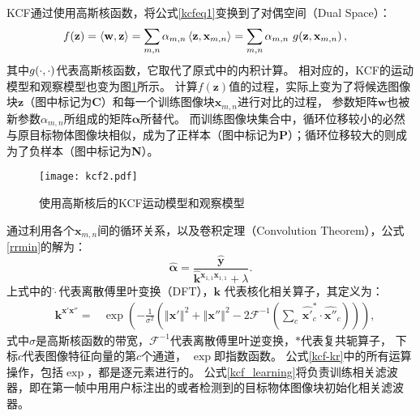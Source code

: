 KCF通过使用高斯核函数，将公式\ref{kcfeq1}变换到了对偶空间（Dual Space）：
\begin{equation}
\begin{aligned}
	f(\mathbf{z})=\left\langle\mathbf{w}, \mathbf{z}\right\rangle&=\sum_{m,n}\alpha_{m,n}\left\langle\mathbf{z},\mathbf{x}_{m,n}\right\rangle=\sum_{m,n}\alpha_{m,n}\ g\negthinspace\left(\mathbf{z},\mathbf{x}_{m,n}\right),\label{kcf-kernelmodel}
\end{aligned}
\end{equation}
其中$g\negthinspace\left(\cdot, \cdot\right)$代表高斯核函数，它取代了原式中的内积计算。
相对应的，KCF的运动模型和观察模型也变为图\ref{kcf2}所示。
计算$f(\mathbf{z})$值的过程，实际上变为了将候选图像块$\mathbf{z}$（图中标记为\textbf{C}）和每一个训练图像块$\mathbf{x}_{m,n}$进行对比的过程，
参数矩阵$\mathbf{w}$也被新参数$\alpha_{m,n}$所组成的矩阵$\boldsymbol{\alpha}$所替代。
而训练图像块集合中，循环位移较小的必然与原目标物体图像块相似，成为了正样本（图中标记为\textbf{P}）；循环位移较大的则成为了负样本（图中标记为\textbf{N}）。

\begin{figure}[htb]
\centering
\texttt{[image: kcf2.pdf]}
\caption{使用高斯核后的KCF运动模型和观察模型}
\label{kcf2}
\end{figure}

通过利用各个$\mathbf{x}_{m,n}$间的循环关系，以及卷积定理（Convolution Theorem），公式\ref{rrmin}的解为：
\begin{equation}
	\hat{\boldsymbol{\alpha}}=\frac{\hat{\mathbf{y}}}{\hat{\mathbf{k}}{}^{\mathbf{x}_{1,1}\mathbf{x}_{1,1}}+\lambda}.\label{kcf_learning}
\end{equation}
上式中的$\hat{\cdot}$代表离散傅里叶变换（DFT），$\mathbf{k}$ 代表核化相关算子，其定义为：
\begin{equation}
\begin{aligned}
	&\mathbf{k}^{\mathbf{x' x''}}=
	&\exp\left(-\frac{1}{\sigma^{2}}\left(\left\Vert \mathbf{x'}\right\Vert ^{2}+\left\Vert \mathbf{x''}\right\Vert ^{2}
	-2\mathcal{F}^{-1}\left(\sum_{c}\,\hat{\mathbf{x'}}_{c}^{*}\cdot\hat{\mathbf{x''}}{}_{c}\right)\right)\right), \label{kcf-kr}
\end{aligned}
\end{equation}
式中$\sigma$是高斯核函数的带宽，$\mathcal{F}^{-1}$代表离散傅里叶逆变换，${*}$代表复共轭算子，
下标$c$代表图像特征向量的第$c$个通道， $\exp$即指数函数。
公式\ref{kcf-kr}中的所有运算操作，包括$\exp$，都是逐元素进行的。
公式\ref{kcf_learning}将负责训练相关滤波器，即在第一帧中用用户标注出的或者检测到的目标物体图像块初始化相关滤波器。

